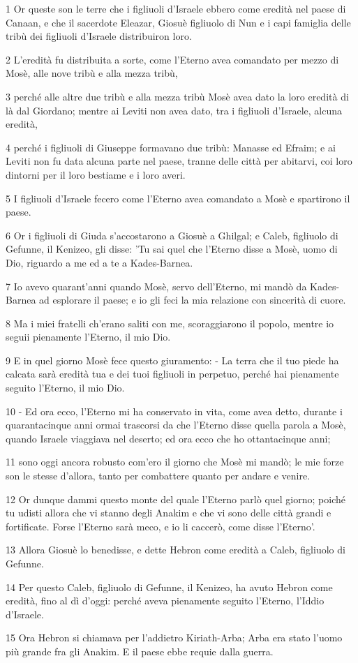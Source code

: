 \par 1 Or queste son le terre che i figliuoli d'Israele ebbero come eredità nel paese di Canaan, e che il sacerdote Eleazar, Giosuè figliuolo di Nun e i capi famiglia delle tribù dei figliuoli d'Israele distribuiron loro.
\par 2 L'eredità fu distribuita a sorte, come l'Eterno avea comandato per mezzo di Mosè, alle nove tribù e alla mezza tribù,
\par 3 perché alle altre due tribù e alla mezza tribù Mosè avea dato la loro eredità di là dal Giordano; mentre ai Leviti non avea dato, tra i figliuoli d'Israele, alcuna eredità,
\par 4 perché i figliuoli di Giuseppe formavano due tribù: Manasse ed Efraim; e ai Leviti non fu data alcuna parte nel paese, tranne delle città per abitarvi, coi loro dintorni per il loro bestiame e i loro averi.
\par 5 I figliuoli d'Israele fecero come l'Eterno avea comandato a Mosè e spartirono il paese.
\par 6 Or i figliuoli di Giuda s'accostarono a Giosuè a Ghilgal; e Caleb, figliuolo di Gefunne, il Kenizeo, gli disse: 'Tu sai quel che l'Eterno disse a Mosè, uomo di Dio, riguardo a me ed a te a Kades-Barnea.
\par 7 Io avevo quarant'anni quando Mosè, servo dell'Eterno, mi mandò da Kades-Barnea ad esplorare il paese; e io gli feci la mia relazione con sincerità di cuore.
\par 8 Ma i miei fratelli ch'erano saliti con me, scoraggiarono il popolo, mentre io seguii pienamente l'Eterno, il mio Dio.
\par 9 E in quel giorno Mosè fece questo giuramento: - La terra che il tuo piede ha calcata sarà eredità tua e dei tuoi figliuoli in perpetuo, perché hai pienamente seguito l'Eterno, il mio Dio.
\par 10 - Ed ora ecco, l'Eterno mi ha conservato in vita, come avea detto, durante i quarantacinque anni ormai trascorsi da che l'Eterno disse quella parola a Mosè, quando Israele viaggiava nel deserto; ed ora ecco che ho ottantacinque anni;
\par 11 sono oggi ancora robusto com'ero il giorno che Mosè mi mandò; le mie forze son le stesse d'allora, tanto per combattere quanto per andare e venire.
\par 12 Or dunque dammi questo monte del quale l'Eterno parlò quel giorno; poiché tu udisti allora che vi stanno degli Anakim e che vi sono delle città grandi e fortificate. Forse l'Eterno sarà meco, e io li caccerò, come disse l'Eterno'.
\par 13 Allora Giosuè lo benedisse, e dette Hebron come eredità a Caleb, figliuolo di Gefunne.
\par 14 Per questo Caleb, figliuolo di Gefunne, il Kenizeo, ha avuto Hebron come eredità, fino al dì d'oggi: perché aveva pienamente seguito l'Eterno, l'Iddio d'Israele.
\par 15 Ora Hebron si chiamava per l'addietro Kiriath-Arba; Arba era stato l'uomo più grande fra gli Anakim. E il paese ebbe requie dalla guerra.

